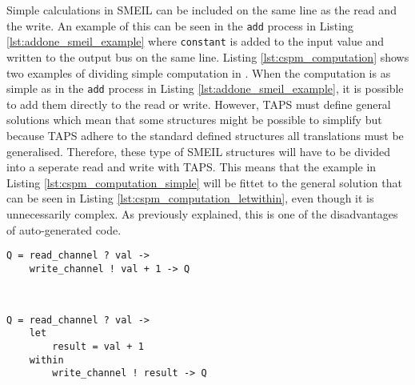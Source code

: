 Simple calculations in SMEIL can be included on the same line as the read and the write. An example of this can be seen in the \texttt{add} process in Listing \ref{lst:addone_smeil_example} where \texttt{constant} is added to the input value and written to the output bus on the same line.
Listing \ref{lst:cspm_computation} shows two examples of dividing simple computation in \cspm{}. When the computation is as simple as in the \texttt{add} process in Listing \ref{lst:addone_smeil_example}, it is possible to add them directly to the read or write.
However, TAPS must define general solutions which mean that some structures might be possible to simplify but because TAPS adhere to the standard defined structures all translations must be generalised. Therefore, these type of SMEIL structures will have to be divided into a seperate read and write with TAPS.
This means that the example in Listing \ref{lst:cspm_computation_simple} will be fittet to the general solution that can be seen in Listing \ref{lst:cspm_computation_letwithin}, even though it is unnecessarily complex. As previously explained, this is one of the disadvantages of auto-generated code.
\begin{minipage}[t]{.98\linewidth}
    \centering
\begin{minipage}[t]{0.45\linewidth}
\begin{verbatim}
Q = read_channel ? val ->
    write_channel ! val + 1 -> Q



\end{verbatim}
  \label{lst:cspm_computation_simple}
\end{minipage}
\hspace{0.6cm}
\begin{minipage}[t]{0.45\linewidth}
\begin{verbatim}
Q = read_channel ? val ->
    let
        result = val + 1
    within
        write_channel ! result -> Q
\end{verbatim}
\label{lst:cspm_computation_letwithin}
\end{minipage}
\vspace{0.3cm}
\label{lst:cspm_computation}
\vspace{1cm}
\end{minipage}

